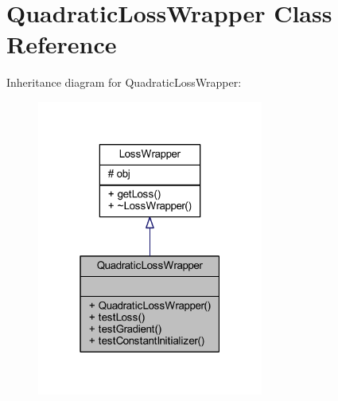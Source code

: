 \hypertarget{class_quadratic_loss_wrapper}{}\section{Quadratic\+Loss\+Wrapper Class Reference}
\label{class_quadratic_loss_wrapper}


Inheritance diagram for Quadratic\+Loss\+Wrapper\+:\nopagebreak
\begin{figure}[H]
\begin{center}
\leavevmode
\includegraphics[width=211pt]{class_quadratic_loss_wrapper__inherit__graph}
\end{center}
\end{figure}


